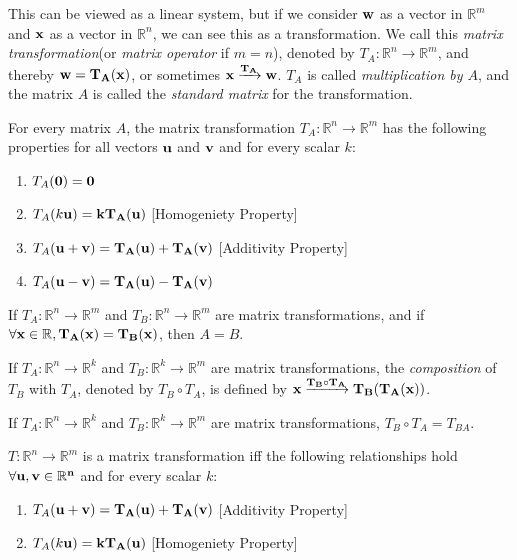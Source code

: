 \documentclass{report}
\begin{document}
		This can be viewed as a linear system, but if we consider $\bf{w}$ as a vector in $\mathbb{R}^m$ and $\bf{x}$ as a vector in $\mathbb{R}^n$, we can see this as a transformation. We call this \emph{matrix transformation}(or \emph{matrix operator} if $m=n$), denoted by $T_A:\mathbb{R}^n\rightarrow \mathbb{R}^m$, and thereby $\bf{w}=T_A(\bf{x})$, or sometimes $\bf{x} \xrightarrow{T_A} \bf{w}$. $T_A$ is called \emph{multiplication by $A$}, and the matrix $A$ is called the \emph{standard matrix} for the transformation.
		
		\begin{thm}
			For every matrix $A$, the matrix transformation $T_A:\mathbb{R}^n \rightarrow \mathbb{R}^m$ has the following properties for all vectors $\bf{u}$ and $\bf{v}$ and for every scalar $k$:
			\begin{enumerate}
				\item $T_A(\bf{0})=\bf{0}$
				\item $T_A(k\bf{u})=kT_A(\bf{u})$ [Homogeniety Property]
				\item $T_A(\bf{u}+\bf{v})=T_A(\bf{u})+T_A(\bf{v})$ [Additivity Property]
				\item $T_A(\bf{u}-\bf{v})=T_A(\bf{u})-T_A(\bf{v})$
			\end{enumerate}
		\end{thm}
		
		\begin{thm}
			If $T_A:\mathbb{R}^n \rightarrow \mathbb{R}^m$ and $T_B:\mathbb{R}^n \rightarrow \mathbb{R}^m$ are matrix transformations, and if $\forall \bf{x} \in \mathbb{R}, T_A(\bf{x})=T_B(\bf{x})$, then $A=B$.
		\end{thm}
		
		\begin{defn}
			If $T_A:\mathbb{R}^n \rightarrow \mathbb{R}^k$ and $T_B:\mathbb{R}^k \rightarrow \mathbb{R}^m$ are matrix transformations, the \emph{composition} of $T_B$ with $T_A$, denoted by $T_B \circ T_A$, is defined by $\bf{x} \xrightarrow{T_B \circ T_A} T_B(T_A(\bf{x}))$.
		\end{defn}
		
		\begin{thm}
			If $T_A:\mathbb{R}^n \rightarrow \mathbb{R}^k$ and $T_B:\mathbb{R}^k \rightarrow \mathbb{R}^m$ are matrix transformations, $T_B \circ T_A=T_{BA}$.
		\end{thm}
		
		\begin{thm}
			$T:\mathbb{R}^n\rightarrow\mathbb{R}^m$ is a matrix transformation iff the following relationships hold $\forall \bf{u}, \bf{v} \in \mathbb{R}^n$ and for every scalar $k$:
			\begin{enumerate}
				\item $T_A(\bf{u}+\bf{v})=T_A(\bf{u})+T_A(\bf{v})$ [Additivity Property]
				\item $T_A(k\bf{u})=kT_A(\bf{u})$ [Homogeniety Property]
			\end{enumerate}
		\end{thm}
		
\end{document}
